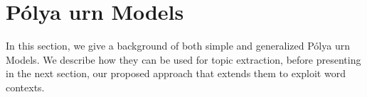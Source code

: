 \documentclass[letterpaper]{article}
\begin{document}








\section{P\'{o}lya urn Models}
In this section, we give a background of both simple and generalized P\'{o}lya urn Models. We describe how they can be used for topic extraction, before presenting in the next section, our proposed approach that extends them to exploit word contexts.
\end{document}
